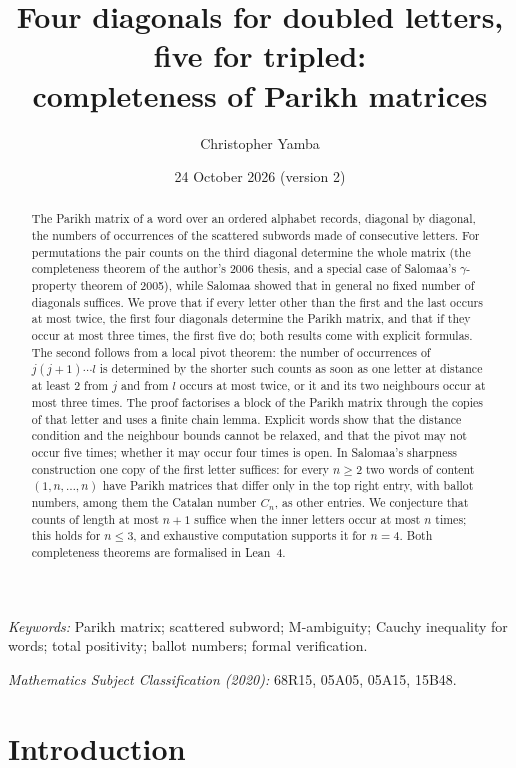 \documentclass[11pt,a4paper]{article}
\title{\vspace{-9mm}Four diagonals for doubled letters, five for tripled:\\[2pt] completeness of Parikh matrices}
\author{Christopher Yamba}
\date{24 October 2026 (version 2)}
\begin{document}
\maketitle
\begin{abstract}
The Parikh matrix of a word over an ordered alphabet records, diagonal by diagonal, the numbers of occurrences of the scattered subwords made of consecutive letters. For permutations the pair counts on the third diagonal determine the whole matrix (the completeness theorem of the author's 2006 thesis, and a special case of Salomaa's $\gamma$-property theorem of 2005), while Salomaa showed that in general no fixed number of diagonals suffices. We prove that if every letter other than the first and the last occurs at most twice, the first four diagonals determine the Parikh matrix, and that if they occur at most three times, the first five do; both results come with explicit formulas. The second follows from a local pivot theorem: the number of occurrences of $j(j+1)\cdots l$ is determined by the shorter such counts as soon as one letter at distance at least $2$ from $j$ and from $l$ occurs at most twice, or it and its two neighbours occur at most three times. The proof factorises a block of the Parikh matrix through the copies of that letter and uses a finite chain lemma. Explicit words show that the distance condition and the neighbour bounds cannot be relaxed, and that the pivot may not occur five times; whether it may occur four times is open. In Salomaa's sharpness construction one copy of the first letter suffices: for every $n\ge2$ two words of content $(1,n,\dots,n)$ have Parikh matrices that differ only in the top right entry, with ballot numbers, among them the Catalan number $C_n$, as other entries. We conjecture that counts of length at most $n+1$ suffice when the inner letters occur at most $n$ times; this holds for $n\le3$, and exhaustive computation supports it for $n=4$. Both completeness theorems are formalised in Lean~4.
\end{abstract}
\medskip
\noindent\textit{Keywords:} Parikh matrix; scattered subword; M-ambiguity; Cauchy inequality for words; total positivity; ballot numbers; formal verification.\par
\noindent\textit{Mathematics Subject Classification (2020):} 68R15, 05A05, 05A15, 15B48.

\section{Introduction}\label{sec:intro}
\end{document}

